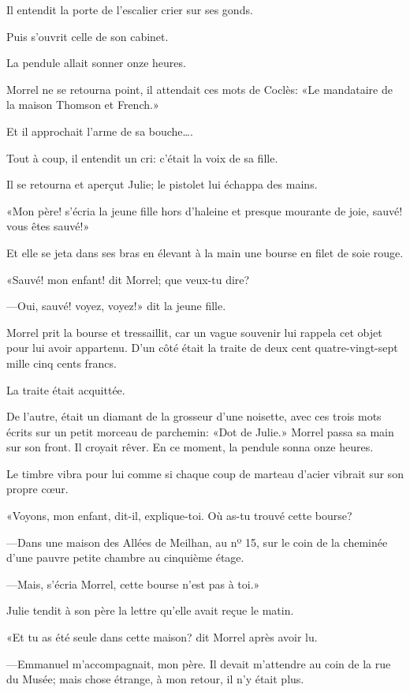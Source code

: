 Il entendit la porte de l'escalier crier sur ses gonds.

Puis s'ouvrit celle de son cabinet.

La pendule allait sonner onze heures.

Morrel ne se retourna point, il attendait ces mots de Coclès: «Le mandataire de la maison Thomson et French.»

Et il approchait l'arme de sa bouche\dots.

Tout à coup, il entendit un cri: c'était la voix de sa fille.

Il se retourna et aperçut Julie; le pistolet lui échappa des mains.

«Mon père! s'écria la jeune fille hors d'haleine et presque mourante de joie, sauvé! vous êtes sauvé!»

Et elle se jeta dans ses bras en élevant à la main une bourse en filet de soie rouge.

«Sauvé! mon enfant! dit Morrel; que veux-tu dire?

—Oui, sauvé! voyez, voyez!» dit la jeune fille.

Morrel prit la bourse et tressaillit, car un vague souvenir lui rappela cet objet pour lui avoir appartenu. D'un côté était la traite de deux cent quatre-vingt-sept mille cinq cents francs.

La traite était acquittée.

De l'autre, était un diamant de la grosseur d'une noisette, avec ces trois mots écrits sur un petit morceau de parchemin: «Dot de Julie.» Morrel passa sa main sur son front. Il croyait rêver. En ce moment, la pendule sonna onze heures.

Le timbre vibra pour lui comme si chaque coup de marteau d'acier vibrait sur son propre cœur.

«Voyons, mon enfant, dit-il, explique-toi. Où as-tu trouvé cette bourse?

—Dans une maison des Allées de Meilhan, au nº 15, sur le coin de la cheminée d'une pauvre petite chambre au cinquième étage.

—Mais, s'écria Morrel, cette bourse n'est pas à toi.»

Julie tendit à son père la lettre qu'elle avait reçue le matin.

«Et tu as été seule dans cette maison? dit Morrel après avoir lu.

—Emmanuel m'accompagnait, mon père. Il devait m'attendre au coin de la rue du Musée; mais chose étrange, à mon retour, il n'y était plus.

